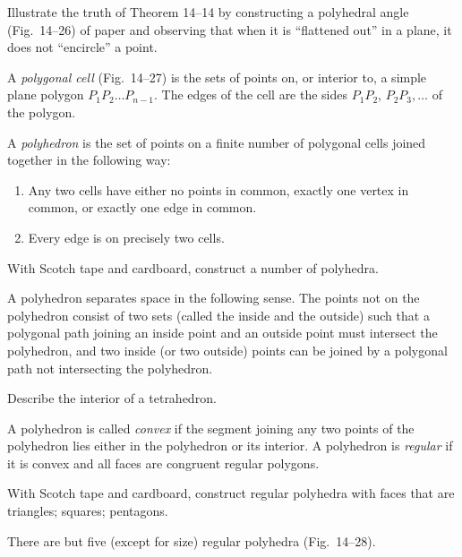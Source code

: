 \documentclass[11pt]{book}
\begin{document}
Illustrate the truth of Theorem 14--14 by constructing a polyhedral angle
(Fig.~14--26) of paper and observing that when it is ``flattened out'' in a
plane, it does not ``encircle'' a point.

\FIGXIVTWENTYSIXTWENTYSEVEN

\begin{definition}
A \emph{polygonal cell} (Fig.~14--27) is the sets of points on, or interior to,
a simple plane polygon $P_1P_2\ldots P_{n-1}$. The edges of the cell are the
sides $P_1P_2$, $P_2P_3, \ldots$ of the polygon.
\end{definition}

A \emph{polyhedron} is the set of points on a finite number of polygonal cells
joined together in the following way:

\begin{enumerate}[label=(\arabic*), leftmargin=2.1em, itemsep=2pt, topsep=3pt]
\item Any two cells have either no points in common, exactly one vertex in
      common, or exactly one edge in common.
\item Every edge is on precisely two cells.
\end{enumerate}

With Scotch tape and cardboard, construct a number of polyhedra.

\begin{theorem}
A polyhedron separates space in the following sense. The points not on the
polyhedron consist of two sets (called the inside and the outside) such that a
polygonal path joining an inside point and an outside point must intersect the
polyhedron, and two inside (or two outside) points can be joined by a polygonal
path not intersecting the polyhedron.
\end{theorem}

Describe the interior of a tetrahedron.

\begin{definition}
A polyhedron is called \emph{convex} if the segment joining any two points of
the polyhedron lies either in the polyhedron or its interior. A polyhedron is
\emph{regular} if it is convex and all faces are congruent regular polygons.
\end{definition}

With Scotch tape and cardboard, construct regular polyhedra with faces that are
triangles; squares; pentagons.

\begin{theorem}
There are but five (except for size) regular polyhedra (Fig.~14--28).
\end{theorem}
\end{document}
